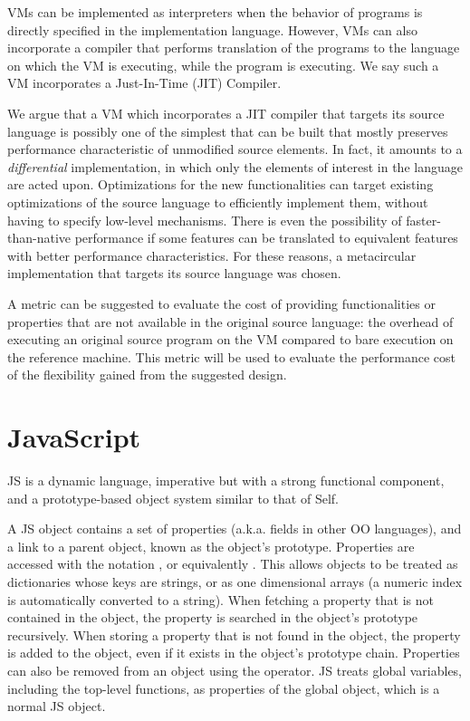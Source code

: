 VMs can be implemented as interpreters when the behavior of
programs is directly specified in the implementation language.  However, VMs
can also incorporate a compiler that performs translation of the programs to
the language on which the VM is executing, while the program is executing. We
say such a VM incorporates a Just-In-Time (JIT) Compiler. 

We argue that a VM which incorporates a JIT compiler that
targets its source language is possibly one of the simplest that can be built
that mostly preserves performance characteristic of unmodified source elements.
In fact, it amounts to a \textit{differential} implementation, in which only
the elements of interest in the language are acted upon. Optimizations for the
new functionalities can target existing optimizations of the source language to
efficiently implement them, without having to specify low-level mechanisms.
There is even the possibility of faster-than-native performance if some
features can be translated to equivalent features with better performance
characteristics. For these reasons, a metacircular implementation that targets
its source language was chosen.

A metric can be suggested to evaluate the cost of providing functionalities or
properties that are not available in the original source language: the overhead
of executing an original source program on the VM compared to bare execution on
the reference machine. This metric will be used to evaluate the performance
cost of the flexibility gained from the suggested design.

\section{JavaScript}

JS is a dynamic language, imperative but with a strong functional component,
and a prototype-based object system similar to that of Self.

A JS object contains a set of properties (a.k.a. fields in other OO languages),
and a link to a parent object, known as the object's prototype. Properties are
accessed with the notation , or equivalently .
This allows objects to be treated as dictionaries whose keys are strings, or as
one dimensional arrays (a numeric index is automatically converted to a
string).  When fetching a property that is not contained in the object, the
property is searched in the object's prototype recursively. When storing a
property that is not found in the object, the property is added to the object,
even if it exists in the object's prototype chain. Properties can also be
removed from an object using the  operator. JS treats global
variables, including the top-level functions, as properties of the global
object, which is a normal JS object.

